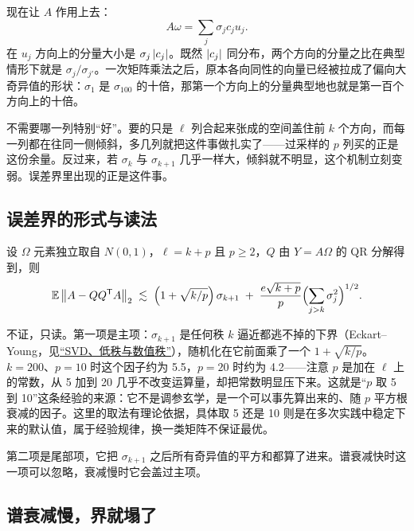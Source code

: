 现在让 \(A\) 作用上去：
\[
A\omega=\sum_j\sigma_jc_ju_j .
\]
在 \(u_j\) 方向上的分量大小是 \(\sigma_j\left|c_j\right|\)。既然 \(\left|c_j\right|\) 同分布，两个方向的分量之比在典型情形下就是 \(\sigma_j/\sigma_{j'}\)。一次矩阵乘法之后，原本各向同性的向量已经被拉成了偏向大奇异值的形状：\(\sigma_1\) 是 \(\sigma_{100}\) 的十倍，那第一个方向上的分量典型地也就是第一百个方向上的十倍。

不需要哪一列特别``好''。要的只是 \(\ell\) 列合起来张成的空间盖住前 \(k\) 个方向，而每一列都在往同一侧倾斜，多几列就把这件事做扎实了——过采样的 \(p\) 列买的正是这份余量。反过来，若 \(\sigma_k\) 与 \(\sigma_{k+1}\) 几乎一样大，倾斜就不明显，这个机制立刻变弱。误差界里出现的正是这件事。

\subsection{误差界的形式与读法}

\begin{proposition}[随机化取子空间的期望误差]
设 \(\Omega\) 元素独立取自 \(N(0,1)\)，\(\ell=k+p\) 且 \(p\ge2\)，\(Q\) 由 \(Y=A\Omega\) 的 QR 分解得到，则
\[
\mathbb{E}\left\lVert A-QQ^{\mathsf{T}}A\right\rVert_2
\;\lesssim\;\Bigl(1+\sqrt{k/p}\Bigr)\,\sigma_{k+1}
\;+\;\frac{e\sqrt{k+p}}{p}\Bigl(\sum_{j>k}\sigma_j^2\Bigr)^{1/2}.
\]
\end{proposition}

不证，只读。第一项是主项：\(\sigma_{k+1}\) 是任何秩 \(k\) 逼近都逃不掉的下界（Eckart--Young，见\hyperref[sec:08-Numerical-Analysis/05-Numerical-Linear-Algebra/06]{``SVD、低秩与数值秩''}），随机化在它前面乘了一个 \(1+\sqrt{k/p}\)。\(k=200\)、\(p=10\) 时这个因子约为 5.5，\(p=20\) 时约为 4.2——注意 \(p\) 是加在 \(\ell\) 上的常数，从 5 加到 20 几乎不改变运算量，却把常数明显压下来。这就是``\(p\) 取 5 到 10''这条经验的来源：它不是调参玄学，是一个可以事先算出来的、随 \(p\) 平方根衰减的因子。这里的取法有理论依据，具体取 5 还是 10 则是在多次实践中稳定下来的默认值，属于经验规律，换一类矩阵不保证最优。

第二项是尾部项，它把 \(\sigma_{k+1}\) 之后所有奇异值的平方和都算了进来。谱衰减快时这一项可以忽略，衰减慢时它会盖过主项。

\subsection{谱衰减慢，界就塌了}

